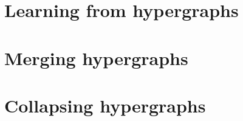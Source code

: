 \documentclass[../Master.tex]{subfiles}
\begin{document}
\section{Learning from hypergraphs}
	

\section{Merging hypergraphs}\label{sec:C:HGMerging}
    

\section{Collapsing hypergraphs}
	

%	
\end{document}
